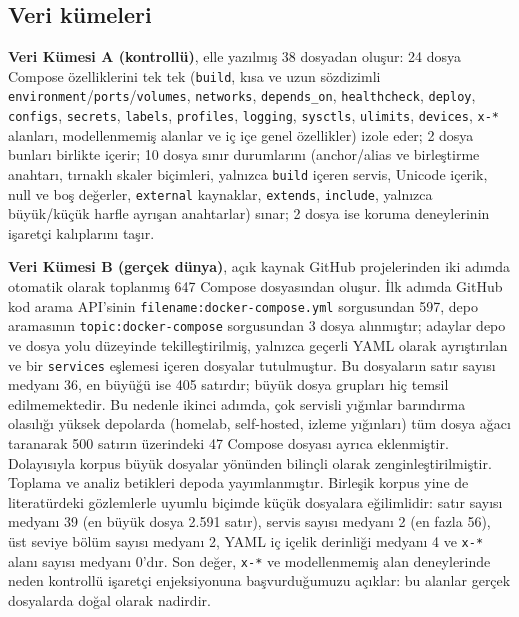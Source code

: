 \documentclass[12pt,a4paper]{article}
\begin{document}
\subsection{Veri kümeleri}
\textbf{Veri Kümesi A (kontrollü)}, elle yazılmış 38 dosyadan oluşur:
24 dosya Compose özelliklerini tek tek (\texttt{build}, kısa ve uzun
sözdizimli \texttt{environment}/\texttt{ports}/\texttt{volumes},
\texttt{networks}, \texttt{depends\_on}, \texttt{healthcheck},
\texttt{deploy}, \texttt{configs}, \texttt{secrets}, \texttt{labels},
\texttt{profiles}, \texttt{logging}, \texttt{sysctls}, \texttt{ulimits},
\texttt{devices}, \texttt{x-*} alanları, modellenmemiş alanlar ve iç içe
genel özellikler) izole eder; 2 dosya bunları birlikte içerir; 10 dosya
sınır durumlarını (anchor/alias ve birleştirme anahtarı, tırnaklı skaler
biçimleri, yalnızca \texttt{build} içeren servis, Unicode içerik, null ve
boş değerler, \texttt{external} kaynaklar, \texttt{extends},
\texttt{include}, yalnızca büyük/küçük harfle ayrışan anahtarlar) sınar;
2 dosya ise koruma deneylerinin işaretçi kalıplarını taşır.


\textbf{Veri Kümesi B (gerçek dünya)}, açık kaynak GitHub projelerinden
iki adımda otomatik olarak toplanmış 647 Compose dosyasından oluşur.
İlk adımda GitHub kod arama API'sinin
\texttt{filename:docker-compose.yml} sorgusundan 597, depo aramasının
\texttt{topic:docker-compose} sorgusundan 3 dosya alınmıştır; adaylar depo
ve dosya yolu düzeyinde tekilleştirilmiş, yalnızca geçerli YAML olarak
ayrıştırılan ve bir \texttt{services} eşlemesi içeren dosyalar
tutulmuştur. Bu dosyaların satır sayısı medyanı 36, en büyüğü ise 405
satırdır; büyük dosya grupları hiç temsil edilmemektedir. Bu nedenle
ikinci adımda, çok servisli yığınlar barındırma olasılığı yüksek depolarda
(homelab, self-hosted, izleme yığınları) tüm dosya ağacı taranarak 500
satırın üzerindeki 47 Compose dosyası ayrıca eklenmiştir. Dolayısıyla
korpus büyük dosyalar yönünden bilinçli olarak zenginleştirilmiştir.
Toplama ve analiz betikleri depoda yayımlanmıştır. Birleşik korpus yine de
literatürdeki gözlemlerle uyumlu biçimde küçük dosyalara eğilimlidir:
satır sayısı medyanı 39 (en büyük dosya 2.591 satır), servis sayısı
medyanı 2 (en fazla 56), üst seviye bölüm sayısı medyanı 2, YAML iç içelik
derinliği medyanı 4 ve \texttt{x-*} alanı sayısı medyanı 0'dır. Son değer, \texttt{x-*}
ve modellenmemiş alan deneylerinde neden kontrollü işaretçi enjeksiyonuna
başvurduğumuzu açıklar: bu alanlar gerçek dosyalarda doğal olarak nadirdir.
\end{document}
